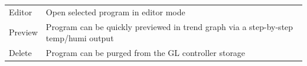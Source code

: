 \documentclass{article}
\begin{document}
\begin{longtable}[]{@{}|l|l|@{}}
\begin{minipage}[t]{0.20\columnwidth}
Editor\strut
\end{minipage} & \begin{minipage}[t]{0.74\columnwidth}\raggedright
Open selected program in editor mode\strut
\end{minipage}\tabularnewline
\begin{minipage}[t]{0.20\columnwidth}\raggedright
Preview\strut
\end{minipage} & \begin{minipage}[t]{0.74\columnwidth}\raggedright
Program can be quickly previewed in trend graph via a step-by-step
temp/humi output\strut
\end{minipage}\tabularnewline
\begin{minipage}[t]{0.20\columnwidth}\raggedright
Delete\strut
\end{minipage} & \begin{minipage}[t]{0.74\columnwidth}\raggedright
Program can be purged from the GL controller storage\strut
\end{minipage}\tabularnewline
\bottomrule
\end{longtable}
\end{document}
